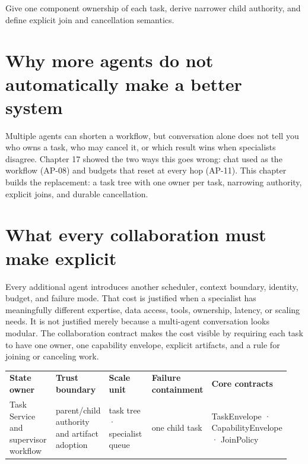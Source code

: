 \begin{bookcallout}
Give one component ownership of each task, derive narrower child authority, and define explicit join and cancellation semantics.
\end{bookcallout}

\section{Why more agents do not automatically make a better system}

Multiple agents can shorten a workflow, but conversation alone does not tell you who owns a task, who may cancel it, or which result wins when specialists disagree. Chapter 17 showed the two ways this goes wrong: chat used as the workflow (AP-08) and budgets that reset at every hop (AP-11). This chapter builds the replacement: a task tree with one owner per task, narrowing authority, explicit joins, and durable cancellation.\par

\section{What every collaboration must make explicit}

Every additional agent introduces another scheduler, context boundary, identity, budget, and failure mode. That cost is justified when a specialist has meaningfully different expertise, data access, tools, ownership, latency, or scaling needs. It is not justified merely because a multi-agent conversation looks modular. The collaboration contract makes the cost visible by requiring each task to have one owner, one capability envelope, explicit artifacts, and a rule for joining or canceling work.\par

\BookTableStart
\fontsize{7.2}{9}\selectfont
\begin{tabular}{@{}Y{0.1880\linewidth}Y{0.1880\linewidth}Y{0.1880\linewidth}Y{0.1880\linewidth}Y{0.1880\linewidth}@{}}
\color{white}\bfseries \textbf{State owner} & \color{white}\bfseries \textbf{Trust boundary} & \color{white}\bfseries \textbf{Scale unit} & \color{white}\bfseries \textbf{Failure containment} & \color{white}\bfseries \textbf{Core contracts} \\
Task Service and supervisor workflow & parent/child authority and artifact adoption & task tree · specialist queue & one child task & TaskEnvelope · CapabilityEnvelope · JoinPolicy \\
\end{tabular}
\BookTableEnd

